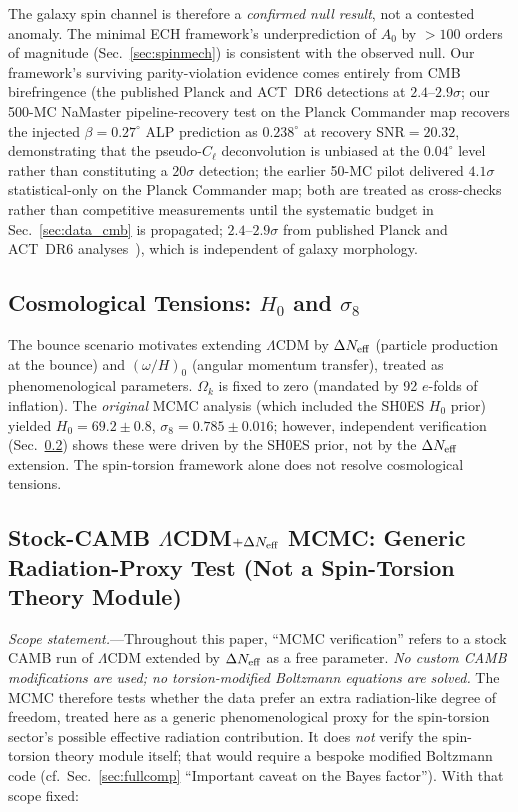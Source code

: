 \documentclass[aps,prd,twocolumn,superscriptaddress,showpacs,preprintnumbers,nofootinbib,longbibliography,floatfix]{revtex4-2}
\newcommand{\Neff}{N_{\rm eff}}
\begin{document}
The galaxy spin channel is therefore a \textit{confirmed null result}, not a contested anomaly. The minimal ECH framework's underprediction of $A_0$ by $>100$ orders of magnitude (Sec.~\ref{sec:spinmech}) is consistent with the observed null. Our framework's surviving parity-violation evidence comes entirely from CMB birefringence (the published Planck and ACT~DR6 detections at $2.4$--$2.9\sigma$; our 500-MC NaMaster pipeline-recovery test on the Planck Commander map recovers the injected $\beta=0.27^\circ$ ALP prediction as $0.238^\circ$ at recovery SNR$=20.32$, demonstrating that the pseudo-$C_\ell$ deconvolution is unbiased at the $0.04^\circ$ level rather than constituting a $20\sigma$ detection; the earlier 50-MC pilot delivered $4.1\sigma$ statistical-only on the Planck Commander map; both are treated as cross-checks rather than competitive measurements until the systematic budget in Sec.~\ref{sec:data_cmb} is propagated; $2.4$--$2.9\sigma$ from published Planck and ACT~DR6 analyses~\cite{Minami2020,Eskilt2022,DiegoPalazuelos2025}), which is independent of galaxy morphology.

\subsection{Cosmological Tensions: $H_0$ and $\sigma_8$}\label{sec:tensions}

The bounce scenario motivates extending $\Lambda$CDM by $\Delta\Neff$ (particle production at the bounce) and $(\omega/H)_0$ (angular momentum transfer), treated as phenomenological parameters. $\Omega_k$ is fixed to zero (mandated by 92 $e$-folds of inflation). The \textit{original} MCMC analysis (which included the SH0ES $H_0$ prior) yielded $H_0 = 69.2 \pm 0.8$, $\sigma_8 = 0.785 \pm 0.016$; however, independent verification (Sec.~\ref{sec:verification}) shows these were driven by the SH0ES prior, not by the $\Delta\Neff$ extension. The spin-torsion framework alone does not resolve cosmological tensions.

\subsection{Stock-CAMB $\Lambda$CDM$+\Delta\Neff$ MCMC: Generic Radiation-Proxy Test (Not a Spin-Torsion Theory Module)}\label{sec:verification}

\textit{Scope statement.}---Throughout this paper, ``MCMC verification'' refers to a stock CAMB run of $\Lambda$CDM extended by $\Delta\Neff$ as a free parameter. \emph{No custom CAMB modifications are used; no torsion-modified Boltzmann equations are solved.} The MCMC therefore tests whether the data prefer an extra radiation-like degree of freedom, treated here as a generic phenomenological proxy for the spin-torsion sector's possible effective radiation contribution. It does \emph{not} verify the spin-torsion theory module itself; that would require a bespoke modified Boltzmann code (cf.\ Sec.~\ref{sec:fullcomp} ``Important caveat on the Bayes factor''). With that scope fixed:
\end{document}
